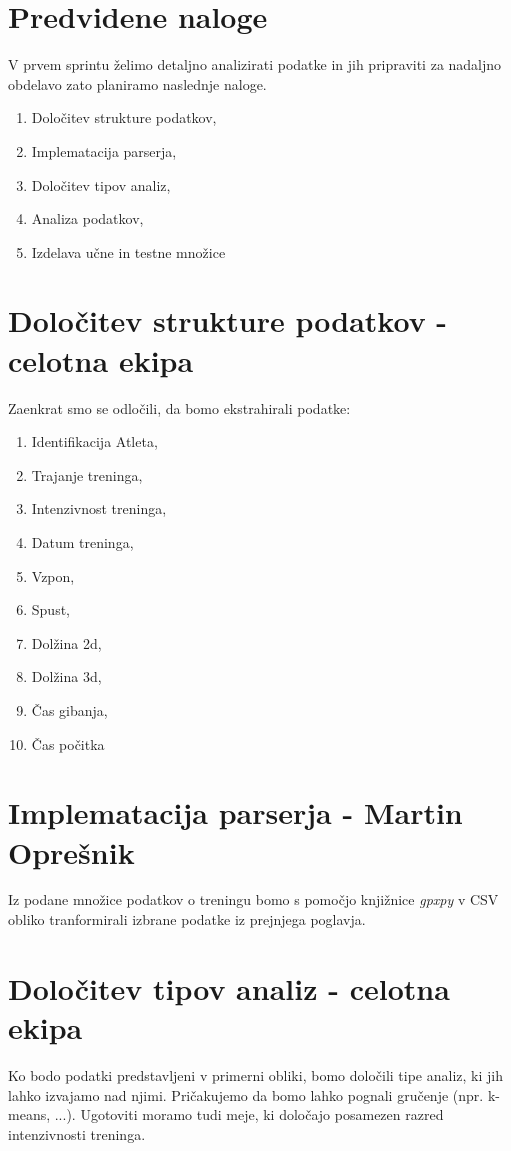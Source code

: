 \documentclass[a4paper,11pt]{article}
\begin{document}
\section{Predvidene naloge}
V prvem sprintu želimo detaljno analizirati podatke in jih pripraviti za nadaljno obdelavo zato planiramo naslednje naloge.
	\begin{enumerate}
		\item{Določitev strukture podatkov,}
		\item{Implematacija parserja,}
		\item{Določitev tipov analiz,}
		\item{Analiza podatkov,}
		\item{Izdelava učne in testne množice}
	\end{enumerate}
	
\section{Določitev strukture podatkov - celotna ekipa}
Zaenkrat smo se odločili, da bomo ekstrahirali podatke:
\begin{enumerate}
		\item{Identifikacija Atleta,}
		\item{Trajanje treninga,}
		\item{Intenzivnost treninga,}
		\item{Datum treninga,}
		\item{Vzpon,}
		\item{Spust,}
		\item{Dolžina 2d,}
		\item{Dolžina 3d,}
		\item{Čas gibanja,}
		\item{Čas počitka}
	\end{enumerate}

\section{Implematacija parserja - Martin Oprešnik}
Iz podane množice podatkov o treningu bomo s pomočjo knjižnice \textit{gpxpy} v CSV obliko tranformirali izbrane podatke iz prejnjega poglavja.
 
\section{Določitev tipov analiz - celotna ekipa}
Ko bodo podatki predstavljeni v primerni obliki, bomo določili tipe analiz, ki jih lahko izvajamo nad njimi. Pričakujemo da bomo lahko pognali gručenje (npr. k-means, ...). Ugotoviti moramo tudi meje, ki določajo posamezen razred intenzivnosti treninga. 
\end{document}
